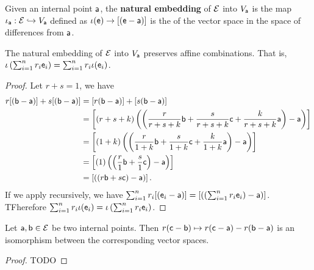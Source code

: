\begin{mathSection}
	\begin{defn}
		Given an internal point $\ens[a]$, the \textbf{natural embedding} of $\Ens$ into $V_{\ens[a]}$ is the map $\iota_{\ens[a]} : \Ens \hookrightarrow V_{\ens[a]}$ defined as $\iota(\ens) \to [(\ens - \ens[a])]$ is the  of the vector space in the space of differences from $\ens[a]$.
	\end{defn}
	
	\begin{coro}
		The natural embedding of $\Ens$ into $V_{\ens[a]}$ preserves affine combinations. That is, $\iota\left(\sum_{i=1}^n r_i \ens_i \right) = \sum_{i=1}^n r_i \iota(\ens_i)$.
	\end{coro}
	
	\begin{proof}
		Let $r+s=1$, we have
		\begin{equation}
			\begin{aligned}
				r[(\ens[b] - \ens[a])] +s[(\ens[b] - \ens[a])] &= [r(\ens[b] - \ens[a])] +[s(\ens[b] - \ens[a])] \\
				&= \left[(r+s+k) \left(\left(\frac{r}{r+s+k}\ens[b] + \frac{s}{r+s+k} \ens[c] +\frac{k}{r+s+k} \ens[a] \right) - \ens[a]\right)\right] \\
				&= \left[(1+k) \left(\left(\frac{r}{1+k}\ens[b] + \frac{s}{1+k} \ens[c] +\frac{k}{1+k} \ens[a] \right) - \ens[a]\right)\right] \\
				&= \left[(1) \left(\left(\frac{r}{1}\ens[b] + \frac{s}{1} \ens[c] \right) - \ens[a]\right)\right] \\
				&= \left[\left(\left(r\ens[b] + s \ens[c] \right) - \ens[a]\right)\right].
			\end{aligned}
		\end{equation}
		If we apply recursively, we have $\sum_{i=1}^{n} r_i [(\ens_i - \ens[a])] = \left[\left(\left(\sum_{i=1}^{n}r_i \ens_i\right) - \ens[a]\right)\right]$. TFherefore $\sum_{i=1}^n r_i \iota(\ens_i) = \iota\left(\sum_{i=1}^n r_i \ens_i \right)$.
	\end{proof}
	
	\begin{prop}
		Let $\ens[a],\ens[b] \in \Ens$ be two internal points. Then $r(\ens[c] - \ens[b]) \mapsto r(\ens[c]-\ens[a]) - r(\ens[b]-\ens[a])$ is an isomorphism between the corresponding vector spaces.
	\end{prop}
	
	\begin{proof}
		TODO
	\end{proof}
\end{mathSection}


